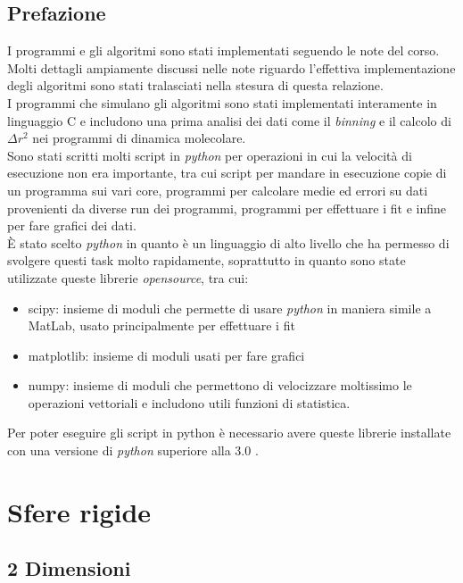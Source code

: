




\tableofcontents 
\newpage
\section*{Prefazione}
I programmi e gli algoritmi sono stati implementati seguendo le note del corso. Molti dettagli ampiamente discussi nelle note riguardo l'effettiva implementazione degli algoritmi sono stati tralasciati nella stesura di questa relazione.\\
I programmi che simulano gli algoritmi sono stati implementati interamente in linguaggio C e includono una prima analisi dei dati come il \emph{binning} e il calcolo di $\Delta r^2$ nei programmi di dinamica molecolare.\\
Sono stati scritti molti script in \emph{python} per operazioni in cui la velocità di esecuzione non era importante, tra cui script per mandare in esecuzione copie di un programma sui vari core, programmi per calcolare medie ed errori su dati provenienti da diverse run dei programmi, programmi per effettuare i fit e infine per fare grafici dei dati.\\
È stato scelto \emph{python} in quanto è un linguaggio di alto livello che ha permesso di svolgere questi task molto rapidamente, soprattutto in quanto sono state utilizzate queste librerie \emph{opensource}, tra cui:
\begin{itemize}
\item scipy: insieme di moduli che permette di usare \emph{python} in maniera simile a MatLab, usato principalmente per effettuare i fit
\item matplotlib: insieme di moduli usati per fare grafici 
\item numpy: insieme di moduli che permettono di velocizzare moltissimo le operazioni vettoriali e includono utili funzioni di statistica.
\end{itemize}
Per poter eseguire gli script in python è necessario avere queste librerie installate con una versione di \emph{python} superiore alla 3.0 .


\chapter{Sfere rigide}

\section{2 Dimensioni}

